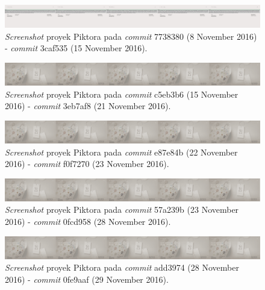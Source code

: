 \begin{enumerate}
\begin{figure}[H]
	
		\includegraphics[scale=0.3]{Gambar/Untitled-2.png}
	\caption{\textit{Screenshot} proyek Piktora pada \textit{commit} 7738380 (8 November 2016) - \textit{commit} 3caf535 (15 November 2016).}
	\label{fig:c2}
\end{figure}

\begin{figure}[H]
	
		\includegraphics[scale=0.3]{Gambar/Untitled-3.png}
	\caption{\textit{Screenshot} proyek Piktora pada \textit{commit} c5eb3b6 (15 November 2016) - \textit{commit} 3eb7af8 (21 November 2016).}
	\label{fig:c3}
\end{figure}

\begin{figure}[H]
	
		\includegraphics[scale=0.3]{Gambar/Untitled-4.png}
	\caption{\textit{Screenshot} proyek Piktora pada \textit{commit} e87e84b (22 November 2016) - \textit{commit} f0f7270 (23 November 2016).}
	\label{fig:c4}
\end{figure}

\begin{figure}[H]
	
		\includegraphics[scale=0.3]{Gambar/Untitled-5.png}
	\caption{\textit{Screenshot} proyek Piktora pada \textit{commit} 57a239b (23 November 2016) - \textit{commit} 0fcd958 (28 November 2016).}
	\label{fig:c5}
\end{figure}

\begin{figure}[H]
	
		\includegraphics[scale=0.3]{Gambar/Untitled-6.png}
	\caption{\textit{Screenshot} proyek Piktora pada \textit{commit} add3974 (28 November 2016) - \textit{commit} 0fe9aaf (29 November 2016).}
	\label{fig:c6}
\end{figure}


\end{enumerate}
